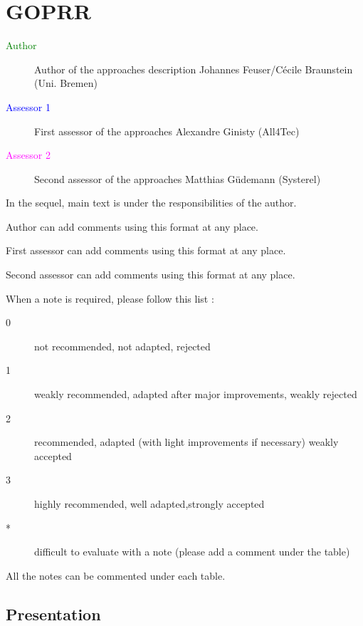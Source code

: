 \chapter{GOPRR}

\begin{description}
\item[\textcolor{green}{Author}] Author of the approaches description
  Johannes Feuser/C\'ecile Braunstein  (Uni. Bremen)
\item[\textcolor{blue}{Assessor 1}] First assessor of the approaches Alexandre Ginisty (All4Tec)
\item[\textcolor{magenta}{Assessor 2}] Second assessor of the approaches Matthias G\"udemann (Systerel)
\end{description}

In the sequel, main text is under the responsibilities of the author.

\begin{author_comment}
Author can add comments using this format at any place.
\end{author_comment}

\begin{assessor1}
First assessor can add comments using this format at any place.
\end{assessor1}

\begin{assessor2}
Second assessor can add comments using this format at any place.
\end{assessor2}

When a note is required, please follow this list :
\begin{description}
\item[0] not recommended, not adapted, rejected
\item[1] weakly recommended, adapted after major improvements, weakly rejected
\item[2] recommended, adapted (with light improvements if necessary)  weakly accepted
\item[3] highly recommended, well adapted,strongly accepted
\item[*] difficult to evaluate with a note (please add a comment under the table)
\end{description}

All the notes can be commented under each table.

\section{Presentation}

